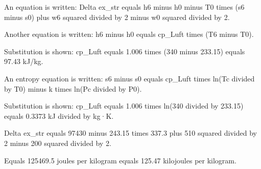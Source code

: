 An equation is written:  
Delta ex_str equals h6 minus h0 minus T0 times (s6 minus s0) plus w6 squared divided by 2 minus w0 squared divided by 2.  

Another equation is written:  
h6 minus h0 equals cp_Luft times (T6 minus T0).  

Substitution is shown:  
cp_Luft equals 1.006 times (340 minus 233.15) equals 97.43 kJ/kg.  

An entropy equation is written:  
s6 minus s0 equals cp_Luft times ln(Tc divided by T0) minus k times ln(Pc divided by P0).  

Substitution is shown:  
cp_Luft equals 1.006 times ln(340 divided by 233.15) equals 0.3373 kJ divided by kg·K.

Delta ex_str equals 97430 minus 243.15 times 337.3 plus 510 squared divided by 2 minus 200 squared divided by 2.  

Equals 125469.5 joules per kilogram equals 125.47 kilojoules per kilogram.